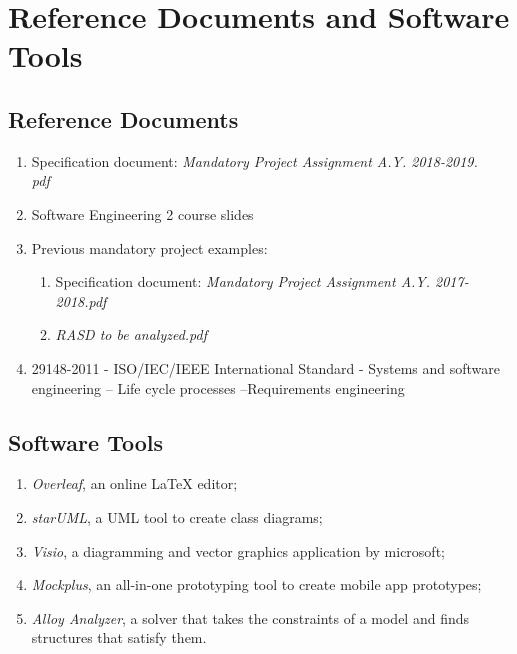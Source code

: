 \section{Reference Documents and Software Tools}

    \subsection{Reference Documents}
        \begin{enumerate}
            \item Specification document: \textit{Mandatory Project Assignment A.Y. 2018-2019.\\pdf}
            
            \item Software Engineering 2 course slides
            
            \item Previous mandatory project examples: 
                \begin{enumerate}
                    \item Specification document: \textit{Mandatory Project Assignment A.Y. 2017-2018.pdf}
                    
                    \item \textit{RASD to be analyzed.pdf}
                \end{enumerate}
                
            \item 29148-2011 - ISO/IEC/IEEE International Standard - Systems and software engineering -- Life cycle processes --Requirements engineering
        \end{enumerate}
        
    \subsection{Software Tools}
    
        \begin{enumerate}
            \item \emph{Overleaf}, an online LaTeX editor;
            \item \emph{starUML},  a UML tool to create class diagrams;
            \item \emph{Visio}, a diagramming and vector graphics application by microsoft;
            \item \emph{Mockplus}, an all-in-one prototyping tool to create mobile app prototypes;
            \item \emph{Alloy Analyzer}, a solver that takes the constraints of a model and finds structures that satisfy them.
        \end{enumerate}